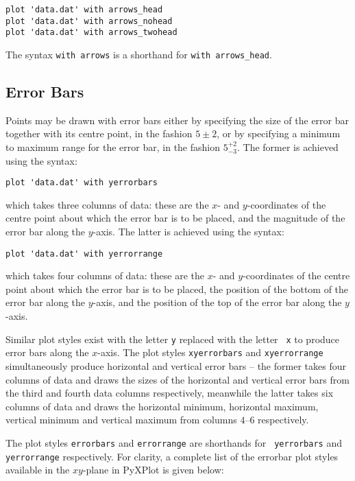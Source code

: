 \begin{verbatim}
plot 'data.dat' with arrows_head
plot 'data.dat' with arrows_nohead
plot 'data.dat' with arrows_twohead
\end{verbatim}

The syntax {\tt with arrows} is a shorthand for {\tt with arrows\_head}.

\subsection{Error Bars}
\label{sec:errorbars}

Points may be drawn with error bars either by specifying the size of the error
bar together with its centre point, in the fashion $5\pm2$, or by specifying a
minimum to maximum range for the error bar, in the fashion $5^{+2}_{-3}$. The
former is achieved using the syntax:

\begin{verbatim}
plot 'data.dat' with yerrorbars
\end{verbatim}

\noindent which takes three columns of data: these are the $x$- and
$y$-coordinates of the centre point about which the error bar is to be placed,
and the magnitude of the error bar along the $y$-axis. The latter is achieved
using the syntax:

\begin{verbatim}
plot 'data.dat' with yerrorrange
\end{verbatim}

\noindent which takes four columns of data: these are the $x$- and
$y$-coordinates of the centre point about which the error bar is to be placed,
the position of the bottom of the error bar along the $y$-axis, and the
position of the top of the error bar along the $y$-axis.

Similar plot styles exist with the letter {\tt y} replaced with the letter {\tt
x} to produce error bars along the $x$-axis. The plot styles {\tt xyerrorbars}
and {\tt xyerrorrange} simultaneously produce horizontal and vertical error
bars -- the former takes four columns of data and draws the sizes of the
horizontal and vertical error bars from the third and fourth data columns
respectively, meanwhile the latter takes six columns of data and draws the
horizontal minimum, horizontal maximum, vertical minimum and vertical maximum
from columns $4$--$6$ respectively.

The plot styles {\tt errorbars} and {\tt errorrange} are shorthands for {\tt
yerrorbars} and {\tt yerrorrange} respectively. For clarity, a complete list of
the errorbar plot styles available in the $xy$-plane in PyXPlot is given below:

